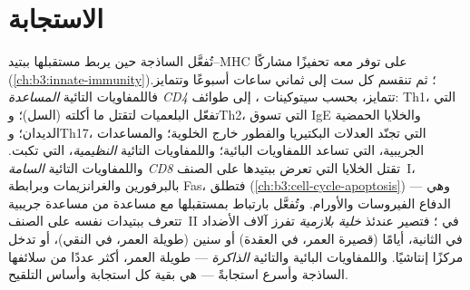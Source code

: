 \section{الاستجابة}

\begin{definition}\label{def:b3:adaptive-immunity:response}
تُفعَّل  الساذجة حين يربط مستقبلها
ببتيد--MHC على  توفر معه تحفيزًا مشاركًا
(\cref{ch:b3:innate-immunity})؛ ثم تنقسم كل ست إلى ثماني
ساعات أسبوعًا وتتمايز. فاللمفاويات التائية \emph{المساعدة
CD4} تتمايز، بحسب سيتوكينات ، إلى طوائف:
Th1، التي تفعّل البلعميات لتقتل ما أكلته (السل)؛ وTh2، التي
تسوق IgE والخلايا الحمضية  الديدان؛ وTh17، التي تجنّد
العدلات  البكتيريا والفطور خارج الخلوية؛ والمساعدات
الجريبية، التي تساعد اللمفاويات البائية؛ واللمفاويات
التائية \emph{النظيمية}، التي تكبت. واللمفاويات التائية
\emph{السامة CD8} تقتل الخلايا التي تعرض ببتيدها على
الصنف~I، بالبرفورين والغرانزيمات وبرابطة Fas، فتطلق
 (\cref{ch:b3:cell-cycle-apoptosis}) --- وهي الدفاع
 الفيروسات والأورام. وتُفعَّل  بارتباط
 بمستقبلها مع مساعدة من  مساعدة جريبية
تتعرف ببتيدات  نفسه على الصنف~II في ؛ فتصير عندئذ \emph{خلية بلازمية} تفرز آلاف الأضداد
في الثانية، أيامًا (قصيرة العمر، في العقدة) أو سنين (طويلة
العمر، في النقي)، أو تدخل مركزًا إنتاشيًا. واللمفاويات
البائية والتائية \emph{الذاكرة} --- طويلة العمر، أكثر عددًا
من سلائفها الساذجة وأسرع استجابةً --- هي بقية كل استجابة
وأساس التلقيح.
\end{definition}

